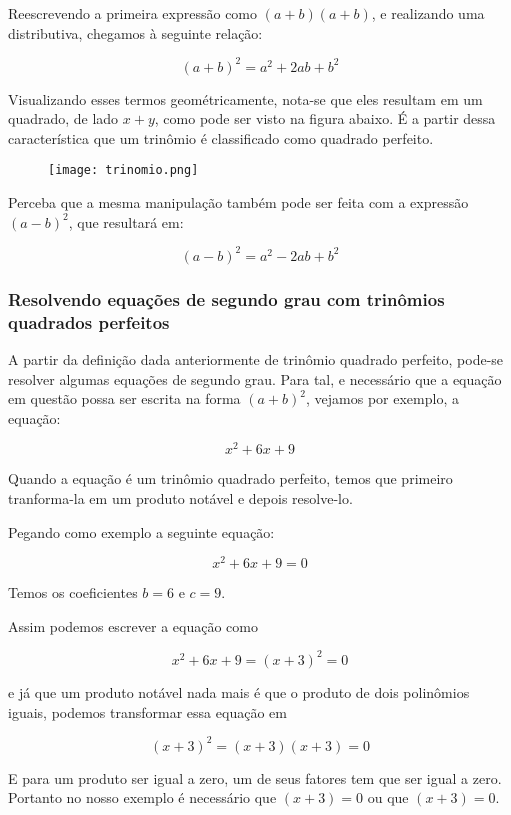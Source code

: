 \documentclass[../resumo.tex]{subfiles}
\begin{document}
	Reescrevendo a primeira expressão como \((a + b)(a + b)\), e realizando uma distributiva, chegamos
	à seguinte relação:

	\[(a + b)^2 = a^2 + 2ab + b^2\]
	

	Visualizando esses termos geométricamente, nota-se que eles resultam em um quadrado,
	de lado \(x + y\), como pode ser visto na figura abaixo. É a partir dessa característica
	que um trinômio é classificado como quadrado perfeito.

	\begin{figure}[H]
		\centering
		\texttt{[image: trinomio.png]}
		\label{fig: Visualização geométrica do trinômio quadrado perfeito}
	\end{figure}

	Perceba que a mesma manipulação também pode ser feita com a expressão \((a - b)^2\), que resultará em:

	\[(a - b)^2 = a^2 - 2ab + b^2\]


	\subsubsection{Resolvendo equações de segundo grau com trinômios quadrados perfeitos}

	A partir da definição dada anteriormente de trinômio quadrado perfeito, pode-se resolver
	algumas equações de segundo grau. Para tal, e necessário que a equação em questão possa ser escrita
	na forma \((a + b)^2\), vejamos por exemplo, a equação:
	
	\[x^2 + 6x + 9\]


	Quando a equação é um trinômio quadrado perfeito, temos que primeiro tranforma-la em um produto notável
	e depois resolve-lo.

	Pegando como exemplo a seguinte equação:

	\[ x^2 + 6x + 9 = 0 \]

	Temos os coeficientes $b = 6$ e $c = 9$.

	Assim podemos escrever a equação como

	\[ x^2 + 6x + 9 = (x + 3)^2 = 0 \]

	e já que um produto notável nada mais é que o produto de dois polinômios iguais, podemos transformar 
	essa equação em

	\[ (x + 3)^2 = (x + 3)(x + 3) = 0 \]

	E para um produto ser igual a zero, um de seus fatores tem que ser igual a zero. Portanto no nosso exemplo
	é necessário que $(x + 3) = 0$ ou que $(x + 3) = 0$.
\end{document}
